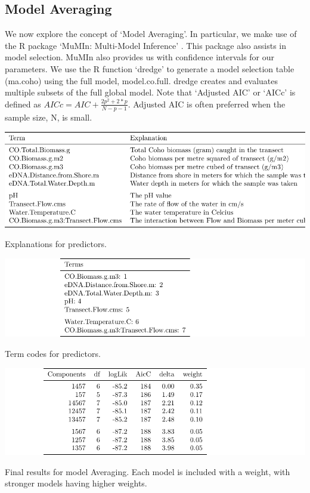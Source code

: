 \newpage

\subsection{Model Averaging}


We now explore the concept of  `Model Averaging'. In particular, we make use of the R package `MuMIn: Multi-Model Inference' \citep{mumin}. This package also assists in model selection. MuMIn also provides us with confidence intervals for our parameters.  We use the R function `dredge' to generate a model selection table (ma.coho) using the full model, model.co.full. dredge creates and evaluates multiple subsets of the full global model. Note that `Adjusted AIC' or `AICc' is defined as $AICc= AIC+ \frac{2p^{2}+2*p}{N-p-1}$. Adjusted AIC is often preferred when the sample size, N, is small.


\begin{table}[H]
\includegraphics{Chapter5Images/termexp.pdf}
\caption{Explanations for predictors.}
\label{fig:termexp}
\end{table}




\begin{table}[H]
\includegraphics{Chapter5Images/termcodes.pdf}
\caption{Term codes for predictors.}
\label{fig:termcodes}
\end{table}


\begin{table}[H]
\includegraphics{Chapter5Images/modelAV.pdf}
\caption{Final results for model Averaging. Each model is included with a weight, with stronger models having higher weights. }
\label{fig:modelav}
\end{table}







